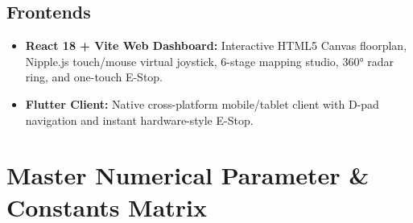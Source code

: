 \documentclass[10pt,a4paper]{article}
\begin{document}
\subsection{Frontends}
\begin{itemize}
    \item \textbf{React 18 + Vite Web Dashboard:} Interactive HTML5 Canvas floorplan, Nipple.js touch/mouse virtual joystick, 6-stage mapping studio, 360° radar ring, and one-touch E-Stop.
    \item \textbf{Flutter Client:} Native cross-platform mobile/tablet client with D-pad navigation and instant hardware-style E-Stop.
\end{itemize}

\section{Master Numerical Parameter \& Constants Matrix}
\end{document}
